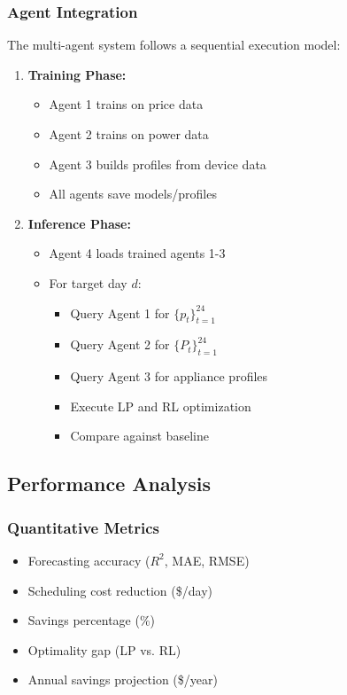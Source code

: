 \documentclass[conference]{IEEEtran}
\begin{document}
\subsubsection{Agent Integration}
The multi-agent system follows a sequential execution model:

\begin{enumerate}
    \item \textbf{Training Phase:}
    \begin{itemize}
        \item Agent 1 trains on price data
        \item Agent 2 trains on power data
        \item Agent 3 builds profiles from device data
        \item All agents save models/profiles
    \end{itemize}
    
    \item \textbf{Inference Phase:}
    \begin{itemize}
        \item Agent 4 loads trained agents 1-3
        \item For target day $d$:
        \begin{itemize}
            \item Query Agent 1 for $\{p_t\}_{t=1}^{24}$
            \item Query Agent 2 for $\{P_t\}_{t=1}^{24}$
            \item Query Agent 3 for appliance profiles
            \item Execute LP and RL optimization
            \item Compare against baseline
        \end{itemize}
    \end{itemize}
\end{enumerate}

\subsection{Performance Analysis}

\subsubsection{Quantitative Metrics}
\begin{itemize}
    \item Forecasting accuracy ($R^2$, MAE, RMSE)
    \item Scheduling cost reduction (\$/day)
    \item Savings percentage (\%)
    \item Optimality gap (LP vs. RL)
    \item Annual savings projection (\$/year)
\end{itemize}
\end{document}
